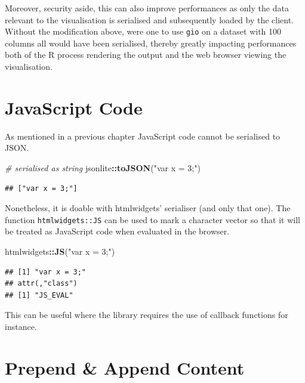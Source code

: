 \documentclass[
]{krantz}
\makeatletter
\newenvironment{Shaded}{\begin{snugshade}}{\end{snugshade}}
\newcommand{\CommentTok}[1]{\textcolor[rgb]{0.37,0.37,0.37}{\textit{#1}}}
\newcommand{\KeywordTok}[1]{\textcolor[rgb]{0.27,0.27,0.27}{\textbf{#1}}}
\newcommand{\NormalTok}[1]{#1}
\newcommand{\OperatorTok}[1]{\textcolor[rgb]{0.43,0.43,0.43}{\textbf{#1}}}
\newcommand{\StringTok}[1]{\textcolor[rgb]{0.5,0.5,0.5}{#1}}
\newenvironment{kframe}{%
\medskip{}
\setlength{\fboxsep}{.8em}
 \def\at@end@of@kframe{}%
 \ifinner\ifhmode%
  \def\at@end@of@kframe{\end{minipage}}%
  \begin{minipage}{\columnwidth}%
 \fi\fi%
 \def\FrameCommand##1{\hskip\@totalleftmargin \hskip-\fboxsep
 \colorbox{shadecolor}{##1}\hskip-\fboxsep
     \hskip-\linewidth \hskip-\@totalleftmargin \hskip\columnwidth}%
 \MakeFramed {\advance\hsize-\width
   \@totalleftmargin\z@ \linewidth\hsize
   \@setminipage}}%
 {\par\unskip\endMakeFramed%
 \at@end@of@kframe}
\renewenvironment{Shaded}{\begin{kframe}}{\end{kframe}}
\makeatother
\begin{document}
Moreover, security aside, this can also improve performances as only the data relevant to the visualisation is serialised and subsequently loaded by the client. Without the modification above, were one to use \texttt{gio} on a dataset with 100 columns all would have been serialised, thereby greatly impacting performances both of the R process rendering the output and the web browser viewing the visualisation.

\hypertarget{javascript-code}{%
\section{JavaScript Code}\label{javascript-code}}

As mentioned in a previous chapter JavaScript code cannot be serialised to JSON.

\begin{Shaded}
\begin{Highlighting}[]
\CommentTok{\# serialised as string}
\NormalTok{jsonlite}\OperatorTok{::}\KeywordTok{toJSON}\NormalTok{(}\StringTok{"var x = 3;"}\NormalTok{)}
\end{Highlighting}
\end{Shaded}

\begin{verbatim}
## ["var x = 3;"]
\end{verbatim}

Nonetheless, it is doable with htmlwidgets' serialiser (and only that one). The function \texttt{htmlwidgets::JS} can be used to mark a character vector so that it will be treated as JavaScript code when evaluated in the browser.

\begin{Shaded}
\begin{Highlighting}[]
\NormalTok{htmlwidgets}\OperatorTok{::}\KeywordTok{JS}\NormalTok{(}\StringTok{"var x = 3;"}\NormalTok{)  }
\end{Highlighting}
\end{Shaded}

\begin{verbatim}
## [1] "var x = 3;"
## attr(,"class")
## [1] "JS_EVAL"
\end{verbatim}

This can be useful where the library requires the use of callback functions for instance.

\hypertarget{prepend-append-content}{%
\section{Prepend \& Append Content}\label{prepend-append-content}}
\end{document}

